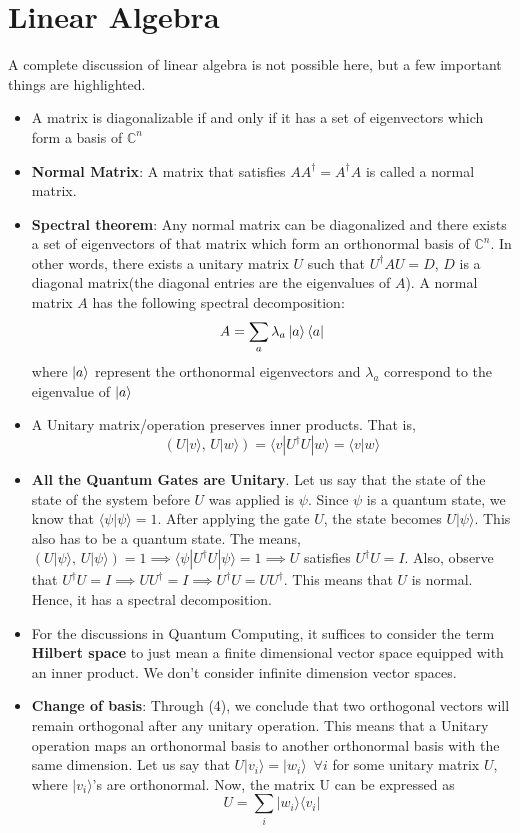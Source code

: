 \documentclass{article}
\begin{document}
\cleardoublepage

\section{Linear Algebra}
A complete discussion of linear algebra is not possible here, but a few important things are highlighted. 
\begin{itemize}
\item A matrix is diagonalizable if and only if it has a set of eigenvectors which form a basis of $\mathbb{C}^n$
\item \textbf{Normal Matrix}: A matrix that satisfies $AA^{\dagger} = A^{\dagger} A$ is called a normal matrix.
\item \textbf{Spectral theorem}: Any normal matrix can be diagonalized and there exists a set of eigenvectors of that matrix which form an orthonormal basis of $\mathbb{C}^n$. In other words, there exists a unitary matrix $U$ such that $U^{\dagger} AU = D$, $D$ is a diagonal matrix(the diagonal entries are the eigenvalues of $A$). A normal matrix $A$ has the following spectral decomposition: $$A = \sum_{a} \lambda_a \ket{a} \bra{a}$$ where $\ket{a}$ represent the orthonormal eigenvectors and $\lambda_a$ correspond to the eigenvalue of $\ket{a}$
\item A Unitary matrix/operation preserves inner products. That is, $$(U|v \rangle ,\, U|w \rangle) = \langle v|U^{\dagger}U|w \rangle = \langle v|w \rangle$$
\item \textbf{All the Quantum Gates are Unitary}. Let us say that the state of the state of the system before $U$ was applied is $\psi$. Since $\psi$ is a quantum state, we know that $\langle \psi | \psi \rangle = 1$. After applying the gate $U$, the state becomes $U|\psi \rangle$. This also has to be a quantum state. The means, $(U|\psi \rangle, \, U|\psi \rangle) = 1 \implies \langle \psi |U^{\dagger}U|\psi \rangle = 1 \implies U$ satisfies $U^{\dagger}U = I$. Also, observe that $U^{\dagger}U = I \implies UU^{\dagger} = I \implies U^{\dagger}U = UU^{\dagger}$. This means that $U$ is normal. Hence, it has a spectral decomposition. 
\item For the discussions in Quantum Computing, it suffices to consider the term \textbf{Hilbert space} to just mean a finite dimensional vector space equipped with an inner product. We don't consider infinite dimension vector spaces.
\item \textbf{Change of basis}: Through (4), we conclude that two orthogonal vectors will remain orthogonal after any unitary operation. This means that a Unitary operation maps an orthonormal basis to another orthonormal basis with the same dimension. Let us say that $U|v_i \rangle = |w_i \rangle \,\,\, \forall i$ for some unitary matrix $U$, where $|v_i \rangle$'s are orthonormal. Now, the matrix U can be expressed as $$U = \sum_i |w_i \rangle \langle v_i|$$
\end{itemize}
\end{document}
